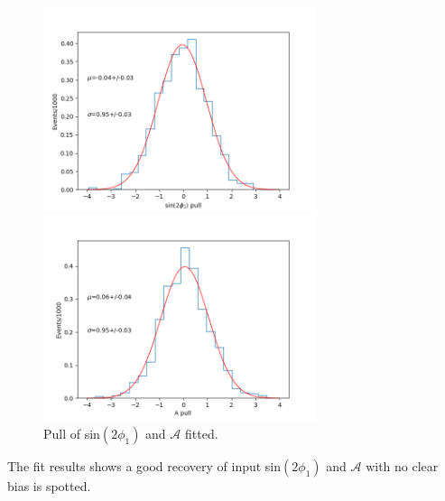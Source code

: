 \begin{figure}[H]
	\begin{minipage}{0.5\linewidth}
		\includegraphics[height=6cm]{figures/pull_hist_S}
	\end{minipage}
	\begin{minipage}{0.5\linewidth}
		\includegraphics[height=6cm]{figures/pull_hist_A}
	\end{minipage}
	\caption{Pull of sin$(2\phi_1)$ and $\mathcal{A}$ fitted.}
\end{figure}

The fit results shows a good recovery of input sin$(2\phi_1)$ and $\mathcal{A}$ with no clear bias is spotted.


